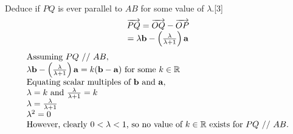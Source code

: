 \documentclass[12pt, a4 paper]{article}
\begin{document}
\begin{outline}[enumerate]
					\color{black}
					\2 Deduce if $PQ$ is ever parallel to $AB$ for some value of $\lambda$.\hfill[3]
					\color{blue}
					\[\begin{array}{c}\overrightarrow {PQ}  = \overrightarrow {OQ}  - \overrightarrow {OP} \\ = \lambda {\bf{b}} - \left( {\frac{\lambda }{{\lambda  + 1}}} \right){\bf{a}}\end{array}\]
					\[\begin{array}{l}{\textrm{Assuming }}PQ{\textrm{ // }}AB,\\\lambda {\bf{b}} - \left( {\frac{\lambda }{{\lambda  + 1}}} \right){\bf{a}} = k({\bf{b}} - {\bf{a}}){\textrm{ for some }}k \in \mathbb{R}\\{\textrm{Equating scalar multiples of }}{\bf{b}}{\textrm{ and }}{\bf{a}},\\\lambda  = k{\textrm{ and }}\frac{\lambda }{{\lambda  + 1}} = k\\\lambda  = \frac{\lambda }{{\lambda  + 1}}\\{\lambda ^2} = 0\\{\textrm{However, clearly }}0 < \lambda  < 1{\textrm{, so no value of }}k \in \mathbb{R}{\textrm{ exists for }}PQ{\textrm{ // }}AB.\end{array}\]



\end{outline}
\end{document}
